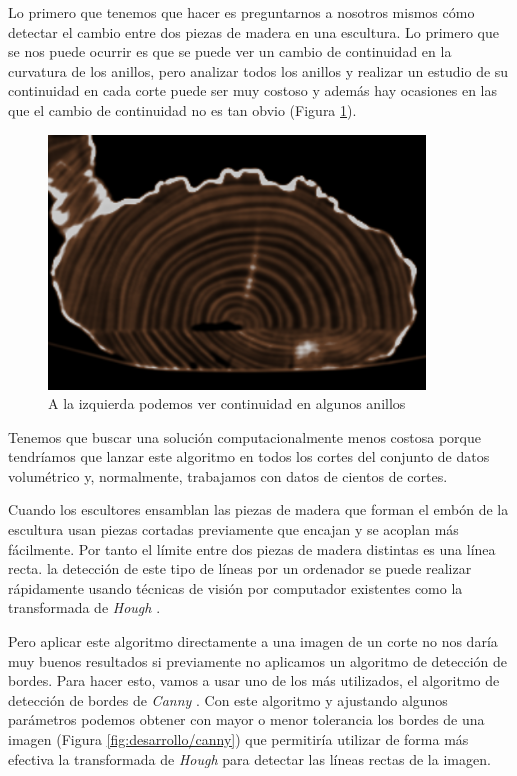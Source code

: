 Lo primero que tenemos que hacer es preguntarnos a nosotros mismos cómo detectar el cambio entre dos piezas de madera en una escultura. Lo primero que se nos puede ocurrir es que se puede ver un cambio de continuidad en la curvatura de los anillos, pero analizar todos los anillos y realizar un estudio de su continuidad en cada corte puede ser muy costoso y además hay ocasiones en las que el cambio de continuidad no es tan obvio (Figura \ref{fig:desarrollo/continuidad-anillos}).

\begin{figure}[H]
	\centering
	\includegraphics[width=10cm]{imagenes/desarrollo/continuidad-anillos}
	\caption{A la izquierda podemos ver continuidad en algunos anillos}
	\label{fig:desarrollo/continuidad-anillos}
\end{figure}

Tenemos que buscar una solución computacionalmente menos costosa porque tendríamos que lanzar este algoritmo en todos los cortes del conjunto de datos volumétrico y, normalmente, trabajamos con datos de cientos de cortes.

Cuando los escultores ensamblan las piezas de madera que forman el embón de la escultura usan piezas cortadas previamente que encajan y se acoplan más fácilmente. Por tanto el límite entre dos piezas de madera distintas es una línea recta. la detección de este tipo de líneas por un ordenador se puede realizar rápidamente usando técnicas de visión por computador existentes como la transformada de \textit{Hough} \cite{duda72}.

Pero aplicar este algoritmo directamente a una imagen de un corte no nos daría muy buenos resultados si previamente no aplicamos un algoritmo de detección de bordes. Para hacer esto, vamos a usar uno de los más utilizados, el algoritmo de detección de bordes de \textit{Canny} \cite{canny86}. Con este algoritmo y ajustando algunos parámetros podemos obtener con mayor o menor tolerancia los bordes de una imagen (Figura \ref{fig:desarrollo/canny}) que permitiría utilizar de forma más efectiva la transformada de \textit{Hough} para detectar las líneas rectas de la imagen.

